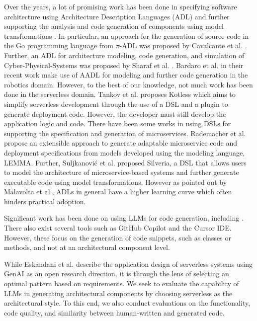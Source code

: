 Over the years, a lot of promising work has been done in specifying software architecture using Architecture Description Languages (ADL) and further supporting the analysis and code generation of components using model transformations \cite{brun2008code, malavolta2012industry}. In particular, an approach for the generation of source code in the Go programming language from $\pi$-ADL was proposed by Cavalcante et al. \cite{cavalcante2014architectureadl}. Further, an ADL for architecture modeling, code generation, and simulation of Cyber-Physical-Systems was proposed by Sharaf et al. \cite{muccini2017caps,muccini_arduino}. Bardaro et al. in their recent work \cite{aadl-robotics} make use of AADL for modeling and further code generation in the robotics domain. 
However, to the best of our knowledge, not much work has been done in the serverless domain. Tankov et al.\cite{kotless} proposes Kotless which aims to simplify serverless development through the use of a DSL and a plugin to generate deployment code. However, the developer must still develop the application logic and code. There have been some works in using DSLs for supporting the specification and generation of microservices. Rademacher et al.\cite{lemma-microservices}
propose an extensible approach to generate adaptable microservice code and deployment specifications from models developed using the modeling language, LEMMA. Further, Suljkanovi{\'c} et al.\cite{silveria} proposed Silveria, a DSL that allows users to model the architecture of microservice-based systems and further generate executable code using model transformations. However as pointed out by Malavolta et al.\cite{malavolta2012industry}, ADLs in general have a higher learning curve which often hinders practical adoption. 

Significant work has been done on using LLMs for code generation, including \cite{bareiss2022codegen, gong2023intendedcodegen, chen2023improvingcodegen, wang2023review_llmcodegeneration, jiang2024surveylargelanguagemodels}. There also exist several tools such as GitHub Copilot and the Cursor IDE. However, these focus on the generation of code snippets, such as classes or methods, and not at an architectural component level. 

While Eskandani et al. \cite{eskandani2024towards_aisystems} describe the application design of serverless systems using GenAI as an open research direction, it is through the lens of selecting an optimal pattern based on requirements. We seek to evaluate the capability of LLMs in generating architectural components by choosing serverless as the architectural style. To this end, we also conduct evaluations on the functionality, code quality, and similarity between human-written and generated code. 
